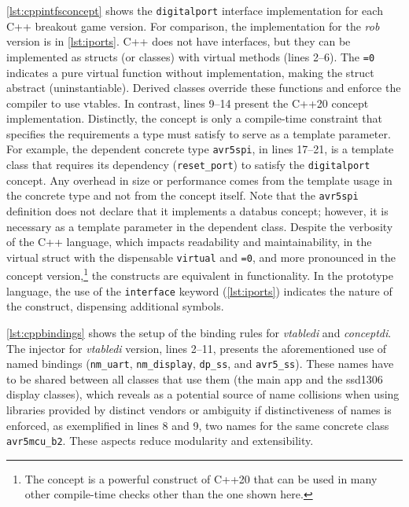 \documentclass[sigconf]{acmart}
\begin{document}
\autoref{lst:cppintfsconcept} shows the {\tt digitalport} interface implementation for each C++ breakout game version. For comparison, the implementation for the \emph{rob} version is in \autoref{lst:iports}. C++ does not have interfaces, but they can be implemented as structs (or classes) with virtual methods (lines 2--6). The {\tt =0} indicates a pure virtual function without implementation, making the struct abstract (uninstantiable). Derived classes override these functions and enforce the compiler to use vtables. In contrast, lines 9--14 present the C++20 concept implementation. Distinctly, the concept is only a compile-time constraint that specifies the requirements a type must satisfy to serve as a template parameter. For example, the dependent concrete type {\tt avr5spi}, in lines 17--21, is a template class that requires its dependency ({\tt reset\_port}) to satisfy the {\tt digitalport} concept. Any overhead in size or performance comes from the template usage in the concrete type and not from the concept itself. Note that the {\tt avr5spi} definition does not declare that it implements a databus concept; however, it is necessary as a template parameter in the dependent class. Despite the verbosity of the C++ language, which impacts readability and maintainability, in the virtual struct with the dispensable {\tt virtual} and {\tt =0}, and more pronounced in the concept version,\footnote{The concept is a powerful construct of C++20 that can be used in many other compile-time checks other than the one shown here.} the constructs are equivalent in functionality. In the prototype language, the use of the {\tt interface} keyword (\autoref{lst:iports}) indicates the nature of the construct, dispensing additional symbols.




\autoref{lst:cppbindings} shows the setup of the binding rules for \emph{vtabledi} and \emph{conceptdi}. The injector for \emph{vtabledi} version, lines 2--11, presents the aforementioned use of named bindings ({\tt nm\_uart}, {\tt nm\_display}, {\tt dp\_ss}, and {\tt avr5\_ss}). These names have to be shared between all classes that use them (the main app and the ssd1306 display classes), which reveals as a potential source of name collisions when using libraries provided by distinct vendors or ambiguity if distinctiveness of names is enforced, as exemplified in lines 8 and 9, two names for the same concrete class {\tt avr5mcu\_b2}. These aspects reduce modularity and extensibility.
\end{document}
